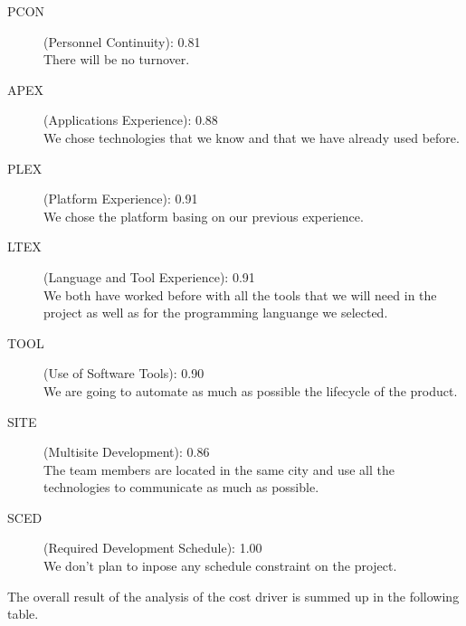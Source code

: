 \documentclass[11pt]{article} %
\begin{document}
\begin{description}
	\item[PCON] (Personnel Continuity): {\large 0.81} \\  There will be no turnover.
	\item[APEX] (Applications Experience): {\large 0.88} \\  We chose technologies that we know and that we have already used before.
	\item[PLEX] (Platform Experience): {\large 0.91} \\  We chose the platform basing on our previous experience.
	\item[LTEX] (Language and Tool Experience): {\large 0.91} \\  We both have worked before with all the tools that we will need in the project as well as for the programming languange we selected.
	\item[TOOL] (Use of Software Tools): {\large 0.90} \\  We are going to automate as much as possible the lifecycle of the product.
	\item[SITE] (Multisite Development): {\large 0.86} \\  The team members are located in the same city and use all the technologies to communicate as much as possible.
	\item[SCED] (Required Development Schedule): {\large 1.00} \\ We don't plan to inpose any schedule constraint on the project.
\end{description}

The overall result of the analysis of the cost driver is summed up in the following table.
\end{document}
